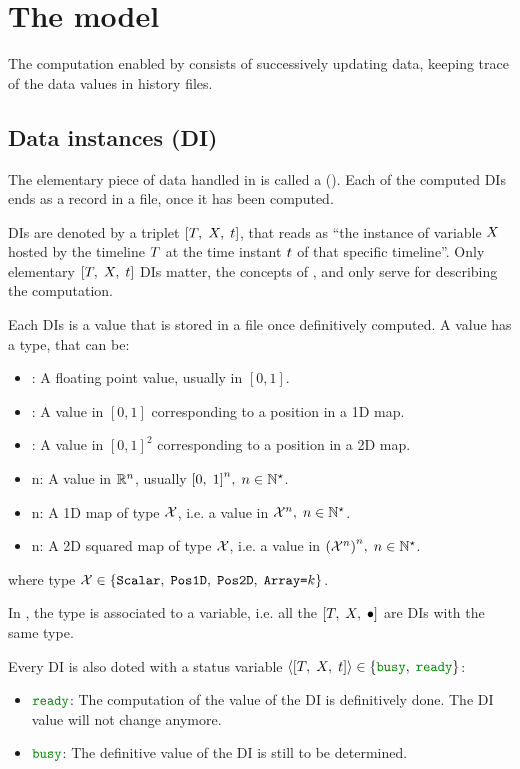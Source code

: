 

\section{The model}

The computation enabled by \CxSOM consists of successively updating data, keeping trace of the data values in history files.

\subsection{Data instances (DI)}

The elementary piece of data handled in \CxSOM is called a  (). Each of the computed DIs ends as a record in a file, once it has been computed.

DIs are denoted by a triplet $\left[ T,\;X,\;t \right]$, that reads as ``the instance of variable $X$ hosted by the timeline $T$ at the time instant $t$ of that specific timeline''. Only elementary $\left[ T,\;X,\;t \right]$ DIs matter, the concepts of ,  and  only serve for describing the computation.


Each DIs is a value that is stored in a file once definitively computed. A value has a type, that can be:
\begin{itemize}
\item \Scalar: A floating point value, usually in $[0,1]$.
  \item {}: A value in $[0,1]$ corresponding to a position in a 1D map.
  \item {}: A value in $[0,1]^2$ corresponding to a position in a 2D map.
  \item \Array n: A value in ${\mathbb{R}}^{n}$, usually ${\left[0,\;1\right]}^{n},\;{n}\in{{\mathbb{N}}^{\star}}$.
  \item {}n: A 1D map of type ${\cal X}$, i.e. a value in ${{\cal X}}^{n},\;{n}\in{{\mathbb{N}}^{\star}}$.
  \item {}n: A 2D squared map of type ${\cal X}$, i.e. a value in ${\left({{\cal X}}^{n}\right)}^{n},\;{n}\in{{\mathbb{N}}^{\star}}$.
\end{itemize}
where type ${{\cal X}}\in{\left\{\mbox{{\tt Scalar}},\;\mbox{{\tt Pos{1}D}},\;\mbox{{\tt Pos{2}D}},\;\mbox{{{\tt Array=}$k$}}\right\}}$.


In \CxSOM, the type is associated to a variable, i.e. all the $\left[ T,\;X,\;\bullet \right]$ are DIs with the same type.

Every DI is also doted with a status variable $\cxDefStatus$:
\begin{itemize}
  \item $\cxReady$: The computation of the value of the DI is definitively done. The DI value will not change anymore.
  \item $\cxBusy$: The definitive value of the DI is still to be determined.
\end{itemize}

